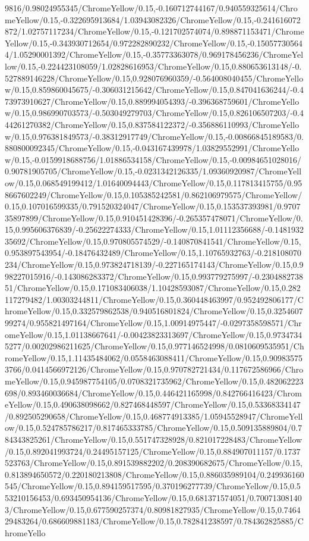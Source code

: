 {\begin{tikzternal}
{9816/0.98024955345/ChromeYellow/0.15,-0.160712744167/0.940559325614/ChromeYellow/0.15,-0.322695913684/1.03943082326/ChromeYellow/0.15,-0.241616072872/1.02757117234/ChromeYellow/0.15,-0.121702574074/0.898871153471/ChromeYellow/0.15,-0.343930712654/0.972282890232/ChromeYellow/0.15,-0.150577305644/1.05290001392/ChromeYellow/0.15,-0.35773363078/0.969178456236/ChromeYellow/0.15,-0.224423108059/1.02828616953/ChromeYellow/0.15,0.880653613148/-0.527889146228/ChromeYellow/0.15,0.928076960359/-0.564008040455/ChromeYellow/0.15,0.859860045675/-0.306031215642/ChromeYellow/0.15,0.847041636244/-0.473973910627/ChromeYellow/0.15,0.889994054393/-0.396368759601/ChromeYellow/0.15,0.986990703573/-0.503049279703/ChromeYellow/0.15,0.826106507203/-0.444261270382/ChromeYellow/0.15,0.837584122372/-0.356886110993/ChromeYellow/0.15,0.976381849573/-0.38312917749/ChromeYellow/0.15,-0.00866845189583/0.880800092345/ChromeYellow/0.15,-0.043167439978/1.03829552991/ChromeYellow/0.15,-0.0159918688756/1.01886534158/ChromeYellow/0.15,-0.00984651028016/0.90781905705/ChromeYellow/0.15,-0.0231342126335/1.09360920987/ChromeYellow/0.15,0.068549199412/1.01640094443/ChromeYellow/0.15,0.117813415755/0.958667602249/ChromeYellow/0.15,0.105385242581/0.862106979575/ChromeYellow/0.15,0.107016599335/0.791520324047/ChromeYellow/0.15,0.153537393981/0.970735897899/ChromeYellow/0.15,0.910451428396/-0.265357478071/ChromeYellow/0.15,0.995606376839/-0.25622274333/ChromeYellow/0.15,1.01112356688/-0.148193235692/ChromeYellow/0.15,0.970805574529/-0.140870841541/ChromeYellow/0.15,0.953897543954/-0.18476432489/ChromeYellow/0.15,1.10765932763/-0.218108070234/ChromeYellow/0.15,0.973824718139/-0.227165174143/ChromeYellow/0.15,0.998227015916/-0.143086283372/ChromeYellow/0.15,0.993779275997/-0.230488273851/ChromeYellow/0.15,0.171083406038/1.10428593087/ChromeYellow/0.15,0.282117279482/1.00303244811/ChromeYellow/0.15,0.360448463997/0.952492806177/ChromeYellow/0.15,0.332579862538/0.940516801824/ChromeYellow/0.15,0.325460799274/0.955821497164/ChromeYellow/0.15,1.00914975447/-0.0297358598571/ChromeYellow/0.15,1.01138667641/-0.00423823313697/ChromeYellow/0.15,0.97347345277/0.00202986211625/ChromeYellow/0.15,0.977146524998/0.0810609535951/ChromeYellow/0.15,1.11435484062/0.0558463088411/ChromeYellow/0.15,0.909835753766/0.0414566972126/ChromeYellow/0.15,0.970782721434/0.117672586966/ChromeYellow/0.15,0.945987754105/0.0708321735962/ChromeYellow/0.15,0.482062223698/0.893460036684/ChromeYellow/0.15,0.446421165998/0.842766416423/ChromeYellow/0.15,0.490638098662/0.827468448597/ChromeYellow/0.15,0.53368334147/0.892505290658/ChromeYellow/0.15,0.468774913385/1.05945528947/ChromeYellow/0.15,0.524785786217/0.817465333785/ChromeYellow/0.15,0.509135889804/0.784343825261/ChromeYellow/0.15,0.551747328928/0.821017228483/ChromeYellow/0.15,0.892041993724/0.24495157125/ChromeYellow/0.15,0.884907011157/0.1737523763/ChromeYellow/0.15,0.891539882202/0.208390682675/ChromeYellow/0.15,0.813894650572/0.220180213808/ChromeYellow/0.15,0.886035989104/0.249936160545/ChromeYellow/0.15,0.894159517595/0.370196277739/ChromeYellow/0.15,0.553210156453/0.693450954136/ChromeYellow/0.15,0.681371574051/0.700713081403/ChromeYellow/0.15,0.677590257374/0.80981827935/ChromeYellow/0.15,0.746429483264/0.686609881183/ChromeYellow/0.15,0.782841238597/0.784362825885/ChromeYello}
\end{tikzternal}}

